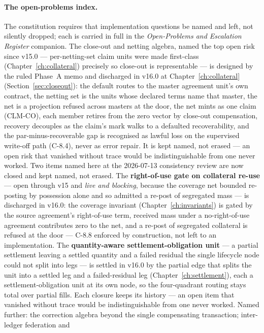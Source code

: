 \documentclass[11pt,a4paper]{article}
\begin{document}
\paragraph{The open-problems index.} The constitution requires that implementation
questions be named and left, not silently dropped; each is carried in full in the
\emph{Open-Problems and Escalation Register} companion. The close-out and netting
algebra, named the top open risk since v15.0 --- per-netting-set claim units were made
first-class (Chapter~\ref{ch:collateral}) precisely so close-out is representable --- is
designed by the ruled Phase~A memo and discharged in v16.0 at Chapter~\ref{ch:collateral}
(Section~\ref{sec:closeout}): the default routes to the master agreement unit's own contract,
the netting set is the units whose declared terms name that master, the net is a projection
refused across masters at the door, the net mints as one claim (CLM-CO), each member retires
from the zero vector by close-out compensation, recovery decouples as the claim's mark walks
to a defaulted recoverability, and the par-minus-recoverable gap is recognised as lawful loss
on the supervised write-off path (C-8.4), never as error repair. It is kept named, not erased
--- an open risk that vanished without trace would be indistinguishable from one never worked. Two items named here
at the 2026-07-13 consistency review are now closed and kept named, not erased. The
\textbf{right-of-use gate on collateral re-use} --- open through v15 and \emph{live and
blocking}, because the coverage net bounded re-posting by possession alone and so admitted
a re-post of segregated mass --- is discharged in v16.0: the coverage invariant
(Chapter~\ref{ch:invariants}) is gated by the source agreement's right-of-use term,
received mass under a no-right-of-use agreement contributes zero to the net, and a re-post
of segregated collateral is refused at the door --- C-8.8 enforced by construction, not
left to an implementation. The \textbf{quantity-aware
settlement-obligation unit} --- a partial settlement leaving a settled quantity and a failed
residual the single lifecycle node could not split into legs --- is settled in v16.0 by the
partial edge that splits the unit into a settled leg and a failed-residual leg
(Chapter~\ref{ch:settlement}), each a settlement-obligation unit at its own node, so the
four-quadrant routing stays total over partial fills. Each closure keeps its history --- an
open item that vanished without trace would be indistinguishable from one never worked.
Named further: the correction
algebra beyond the single compensating transaction; inter-ledger federation and
\end{document}

